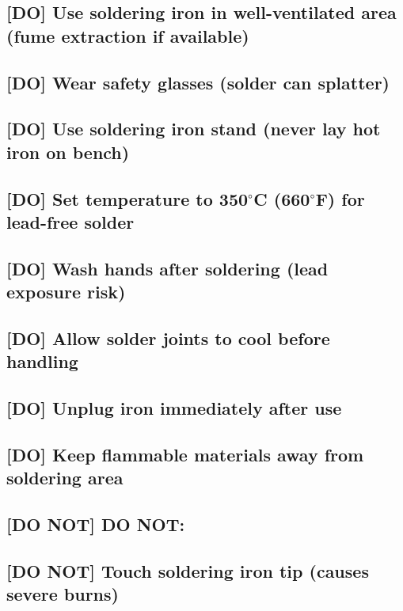 \documentclass[11pt,letterpaper]{article}
\begin{document}
{{\subsection*{[DO] Use soldering iron in well-ventilated area (fume extraction if available)}

\subsection*{[DO] Wear safety glasses (solder can splatter)}

\subsection*{[DO] Use soldering iron stand (never lay hot iron on bench)}

\subsection*{[DO] Set temperature to 350$^\circ$C (660$^\circ$F) for lead-free solder}

\subsection*{[DO] Wash hands after soldering (lead exposure risk)}

\subsection*{[DO] Allow solder joints to cool before handling}

\subsection*{[DO] Unplug iron immediately after use}

\subsection*{[DO] Keep flammable materials away from soldering area}

\subsection*{[DO NOT] DO NOT:}

\subsection*{[DO NOT] Touch soldering iron tip (causes severe burns)}

}}
\end{document}
